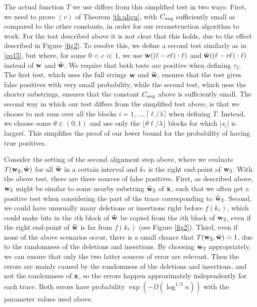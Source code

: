 \documentclass[final,12pt]{colt2018} %
\newcommand{\1}{\mathbf{1}}
\newcommand{\wt}{\widetilde}
\newcommand{\wh}{\widehat}
\def\x{{\bf x}}
\def\w{{\bf w}}
\def\cavg{C_{\rm avg}}
\begin{document}
The actual function $T$ we use differs from this simplified test in two ways: First,  we need to prove $(v)$ of Theorem \ref{th:align}, with $\cavg$ sufficiently small as compared to the other constants, in order for our reconstruction algorithm to work. For the test described above it is not clear that this holds, due to the effect described in Figure \ref{fig2}. To resolve this, we define a second test similarly as in \eqref{eq15}, but where, for some $0<c\ll 1$, we use $\w( (\ell-c\ell):\ell )$ and $\wt\w( (\ell-c\ell):\ell )$ instead of $\w$ and $\wt\w$. We require that both tests are positive when defining $\tau_2$. The first test, which uses the full strings $\w$ and $\wt\w$, ensures that the test gives false positives with very small probability, while the second test, which uses the shorter substrings, ensures that the constant $\cavg$ above is sufficiently small. The second way in which our test differs from the simplified test above, is that we choose to not sum over all the blocks $i=1,\dots,\lceil\ell/\lambda\rceil$ when defining $T$. Instead, we choose some $\theta\in(0,1)$ and use only the $\lfloor \theta\ell/\lambda \rfloor$ blocks for which $|s_i|$ is largest. This simplifies the proof of our lower bound for the probability of having true positives.

Consider the setting of the second alignment step above, where we evaluate $T(\w_2,\wt\w)$ for all $\wt\w$ in a certain interval and $k_*$ is the right end-point of $\w_2$. With the above test, there are three sources of false positives.
First, as described above, $\w_2$ might be similar to some nearby substring $\wh\w_2$ of $\x$, such that we often get a positive test when considering the part of the trace corresponding to $\wh\w_2$.
Second, we could have unusually many deletions or insertions right before $f(k_*)$, which could make bits in the $i$th block of $\wt\w$ be copied from the $i$th block of $\w_2$, even if the right end-point of $\wt\w$ is far from $f(k_*)$ (see Figure \ref{fig2}).
Third, even if none of the above scenarios occur, there is a small chance that $T(\w_2,\wt\w)=1$, due to the randomness of the deletions and insertions. By choosing $\w_2$ appropriately, we can ensure that only the two latter sources of error are relevant. Then the errors are mainly caused by the randomness of the deletions and insertions, and not the randomness of $\x$, so the errors happen approximately independently for each trace. Both errors have probability $\exp(-\Omega(\log^{1/3}n))$ with the parameter values used above.
\end{document}
